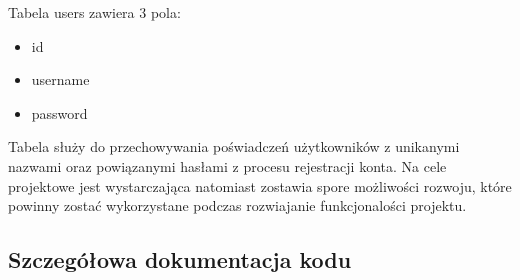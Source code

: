 \documentclass[12pt,a4paper,oneside]{article}
\theoremstyle{definition}
\numberwithin{equation}{section}
\begin{document}
    Tabela users zawiera 3 pola:
    \begin{itemize}
      \item id
      \item username
      \item password
   \end{itemize}

       Tabela służy do przechowywania poświadczeń użytkowników z unikanymi nazwami oraz powiązanymi hasłami z procesu rejestracji konta. Na cele projektowe jest wystarczająca natomiast zostawia spore możliwości rozwoju, które powinny zostać wykorzystane podczas rozwiajanie funkcjonalości projektu. 




\subsection{Szczegółowa dokumentacja kodu}
\end{document}
